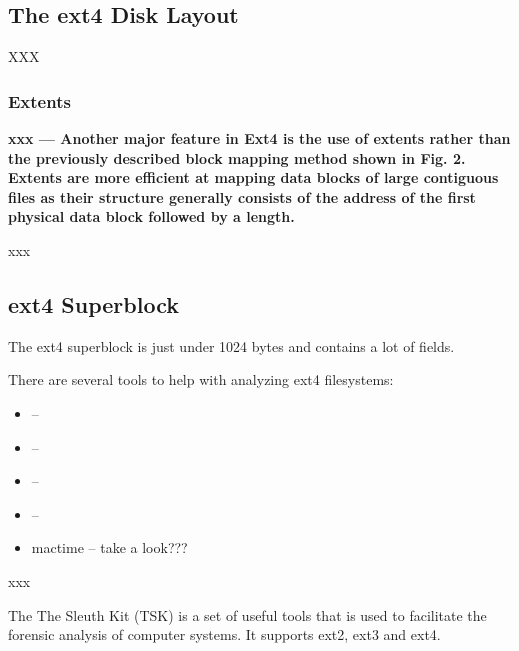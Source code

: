 
\subsection{The ext4 Disk Layout}

XXX

\subsubsection{Extents}

\textbf{xxx --- Another major feature in Ext4 is the use of extents rather than the previously described block mapping method shown in Fig. 2. Extents are more efficient at mapping data blocks of large contiguous files as their structure generally consists of the address of the first physical data block followed by a length.}

xxx


\subsection{ext4 Superblock}

The ext4 superblock is just under 1024 bytes and contains a lot of fields. 

There are several tools to help with analyzing ext4 filesystems:

\begin{itemize}
	\item {} -- 
	\item {} -- 
	\item {} -- 
	\item {} -- 
	\item mactime -- take a look???
\end{itemize}

\noindent
xxx

The The Sleuth Kit (TSK) is a set of useful tools that is used to facilitate the forensic analysis of computer systems. It supports ext2, ext3 and ext4.


